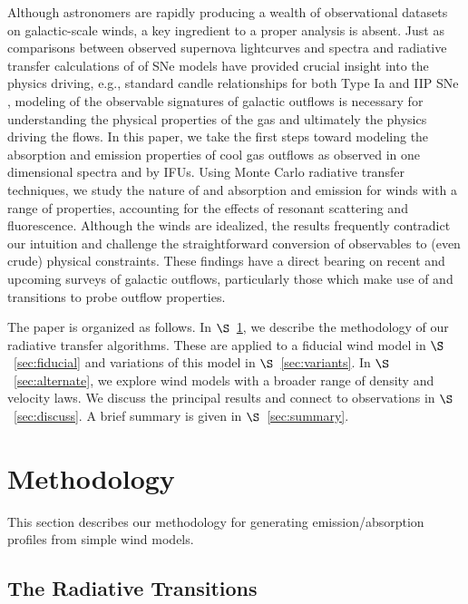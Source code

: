 \documentclass[12pt,preprint]{aastex}
\begin{document}
Although astronomers are rapidly producing a wealth of observational
datasets on galactic-scale winds, a key ingredient to a proper
analysis is absent.  Just as comparisons between observed supernova 
lightcurves and spectra and radiative transfer calculations of
of SNe models have provided crucial insight into the physics driving,
e.g., standard candle relationships for both Type Ia and IIP SNe 
\citep{kw07,kw09}, modeling of the observable signatures of galactic
outflows is necessary for understanding the physical
properties of the gas and ultimately the physics driving the flows. 
In this paper, we take the first steps toward modeling the absorption
and emission properties of cool gas outflows as observed in one
dimensional spectra and by IFUs.  Using Monte Carlo
radiative transfer techniques, we study the nature of  and
 absorption and emission for winds with a range of
properties, accounting for the effects of resonant scattering and
fluorescence. 
Although the winds are idealized, the results frequently
contradict our intuition and 
challenge the straightforward conversion of observables to (even crude) physical
constraints.  These findings have a direct bearing on
recent and upcoming surveys of galactic outflows, particularly those
which make use of  and  transitions to probe
outflow properties.

The paper is organized as follows.  In $\S$~\ref{sec:method}, we
describe the methodology of our radiative transfer algorithms.  These
are applied to a fiducial wind model in $\S$~\ref{sec:fiducial} and
variations of this model in $\S$~\ref{sec:variants}.  In
$\S$~\ref{sec:alternate}, we explore wind models with a broader range
of density and velocity laws. We discuss the principal results and
connect to observations in $\S$~\ref{sec:discuss}.  A brief summary is
given in $\S$~\ref{sec:summary}. 

\section{Methodology}
\label{sec:method}

This section describes our methodology for generating
emission/absorption profiles from simple wind models.

\subsection{The Radiative Transitions}
\end{document}
